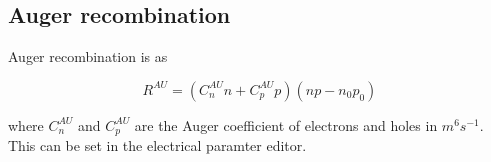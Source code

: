 \subsection{Auger recombination}
\label{sec:auger}
Auger recombination is as

\begin{equation}
R^{AU}=(C^{AU}_{n}n+C^{AU}_{p}p)(np-n_{0}p_{0})
\end{equation}

where $C^{AU}_{n}$ and $C^{AU}_{p}$ are the Auger coefficient of electrons and holes in $m^6 s^{-1}$. This can be set in the electrical paramter editor.

